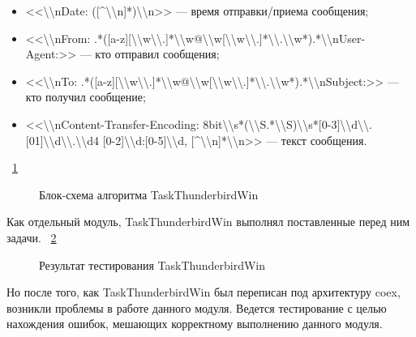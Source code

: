 \begin{itemize}
  \item <<\textbackslash \textbackslash nDate: ([\textasciicircum \textbackslash \textbackslash n]*)\textbackslash \textbackslash n>> --- время отправки/приема сообщения;
  
  \item <<\textbackslash \textbackslash nFrom: .*([a-z][\textbackslash \textbackslash w\textbackslash \textbackslash .]*\textbackslash \textbackslash w@\textbackslash \textbackslash w[\textbackslash \textbackslash w\textbackslash \textbackslash .]*\textbackslash \textbackslash .\textbackslash \textbackslash w*).*\textbackslash \textbackslash nUser-Agent:>> --- кто отправил сообщения;
  
  \item <<\textbackslash \textbackslash nTo: .*([a-z][\textbackslash \textbackslash w\textbackslash \textbackslash .]*\textbackslash \textbackslash w@\textbackslash \textbackslash w[\textbackslash \textbackslash w\textbackslash \textbackslash .]*\textbackslash \textbackslash .\textbackslash \textbackslash w*).*\textbackslash \textbackslash nSubject:>> --- кто получил сообщение;
  
  \item <<\textbackslash \textbackslash nContent-Transfer-Encoding: 8bit\textbackslash \textbackslash s*(\textbackslash \textbackslash S.*\textbackslash \textbackslash S)\textbackslash \textbackslash s*[0-3]\textbackslash \textbackslash d\textbackslash \textbackslash .[01]\textbackslash \textbackslash d\textbackslash \textbackslash .\textbackslash \textbackslash d{4} [0-2]\textbackslash \textbackslash d:[0-5]\textbackslash \textbackslash d, [\textasciicircum \textbackslash \textbackslash n]*\textbackslash \textbackslash n>> --- текст сообщения.
\end{itemize}

~\ref{teresh_6:teresh_6}

\begin{figure}[h!]
\caption{ Блок-схема алгоритма TaskThunderbirdWin }
\label{teresh_6:teresh_6}
\end{figure}

Как отдельный модуль, TaskThunderbirdWin выполнял поставленные перед ним задачи.
~\ref{teresh_7:teresh_7}

\begin{figure}[h!]
\caption{ Результат тестирования TaskThunderbirdWin }
\label{teresh_7:teresh_7}
\end{figure}

Но после того, как TaskThunderbirdWin был переписан под архитектуру coex, возникли проблемы в работе данного модуля. Ведется тестирование с целью нахождения ошибок, мешающих корректному выполнению данного модуля.

\clearpage
